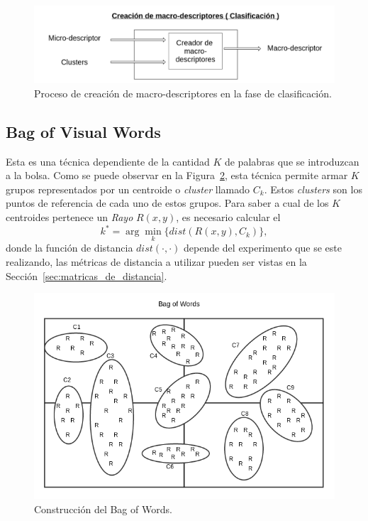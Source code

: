 	
	\begin{figure}[bt]
		\centering
    		\includegraphics[width=1\textwidth]{Figuras/Diagramas/Extractor_macrodescriptores_clasificacion.png}
  		\caption{Proceso de creación de macro-descriptores en la fase de clasificación.}
  		\label{algoritmo:fig:macro_descriptores:clasificacion}
	\end{figure}	



	\subsection{Bag of Visual Words}
	\label{algoritmo:bow}
		Esta es una técnica dependiente de la cantidad $K$ de palabras que se introduzcan a la bolsa. Como se puede observar en la Figura~\ref{algoritmo:fig:bow}, esta técnica permite armar $K$ grupos representados por un centroide o \textit{cluster} llamado $C_k$. Estos \textit{clusters} son los puntos de referencia de cada uno de estos grupos. Para saber a cual de los $K$ centroides pertenece un \textit{Rayo} $R(x,y)$, es necesario calcular el
		\begin{equation}
  			\label{algoritmo:eq:dist}
			k^* = \arg \min_k \{\mathit{dist}(R(x,y),C_k)\},
		\end{equation}
		donde la función de distancia $\mathit{dist}(\cdot,\cdot)$ depende del experimento que se este realizando, las métricas de distancia a utilizar pueden ser vistas en la Sección~\ref{sec:matricas_de_distancia}.

	\begin{figure}[tb]
		\centering
    		\includegraphics[width=1\textwidth]{Figuras/Diagramas/bow_solo.png}
  		\caption{Construcción del Bag of Words.}
  		\label{algoritmo:fig:bow}
	\end{figure}	

